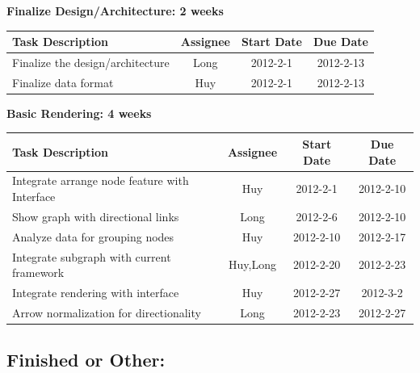 \documentclass[12pt, letterpaper]{article}
\begin{document}
  \begin{center}
		{\bf Finalize Design/Architecture: 2 weeks}
    \begin{tabular}{|p{8.3cm} || c | c | c | }
      \hline
      Task Description & Assignee & Start Date & Due Date \\
      \hline
	    Finalize the design/architecture & Long & 2012-2-1 & 2012-2-13 \\
	    Finalize data format  & Huy & 2012-2-1 & 2012-2-13 \\
      \hline
    \end{tabular}
  \end{center}

  \begin{center}
		{\bf Basic Rendering: 4 weeks}
    \begin{tabular}{| p{8.3cm} || c | c | c | }
      \hline
      Task Description & Assignee & Start Date & Due Date \\
      \hline
	    Integrate arrange node feature with Interface & Huy & 2012-2-1 & 2012-2-10 \\
            Show graph with directional links & Long & 2012-2-6 &  2012-2-10 \\
            Analyze data for grouping nodes & Huy & 2012-2-10 & 2012-2-17 \\
            Integrate subgraph with current framework & Huy,Long & 2012-2-20 & 2012-2-23 \\
            Integrate rendering with interface  & Huy & 2012-2-27 & 2012-3-2 \\  
            Arrow normalization for directionality  & Long & 2012-2-23 & 2012-2-27 \\
      \hline
    \end{tabular}
  \end{center}


	\subsection{Finished or Other:}
\end{document}
